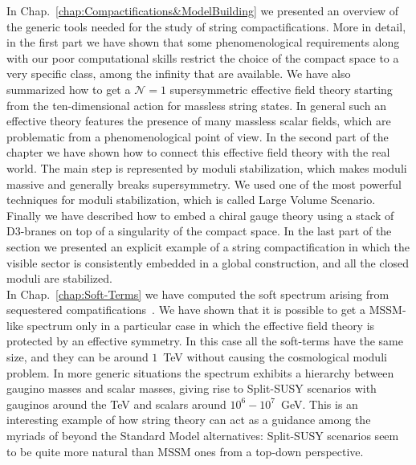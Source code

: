 \documentclass[12pt,a4paper]{book}
\begin{document}
In Chap.~\ref{chap:Compactifications&ModelBuilding} we presented an overview of the generic tools needed for the study of string compactifications. More in detail, in the first part we have shown that some phenomenological requirements along with our poor computational skills restrict the choice of the compact space to a very specific class, among the infinity that are available. We have also summarized how to get a $\mathcal{N} = 1$ supersymmetric effective field theory starting from the ten-dimensional action for massless string states. In general such an effective theory features the presence of many massless scalar fields, which are problematic from a phenomenological point of view. In the second part of the chapter we have shown how to connect this effective field theory with the real world. The main step is represented by moduli stabilization, which makes moduli massive and generally breaks supersymmetry. We used one of the most powerful techniques for moduli stabilization, which is called Large Volume Scenario. Finally we have described how to embed a chiral gauge theory using a stack of D3-branes on top of a singularity of the compact space. In the last part of the section we presented an explicit example of a string compactification in which the visible sector is consistently embedded in a global construction, and all the closed moduli are stabilized.\\

In Chap.~\ref{chap:Soft-Terms} we have computed the soft spectrum arising from sequestered compatifications~\cite{Aparicio:2014wxa}. We have shown that it is possible to get a MSSM-like spectrum only in a particular case in which the effective field theory is protected by an effective symmetry. In this case all the soft-terms have the same size, and they can be around $1 \,$ TeV without causing the cosmological moduli problem. In more generic situations the spectrum exhibits a hierarchy between gaugino masses and scalar masses, giving rise to Split-SUSY scenarios with gauginos around the TeV and scalars around $10^6-10^7 \,$ GeV. This is an interesting example of how string theory can act as a guidance among the myriads of beyond the Standard Model alternatives: Split-SUSY scenarios seem to be quite more natural than MSSM ones from a top-down perspective.\\
\end{document}
